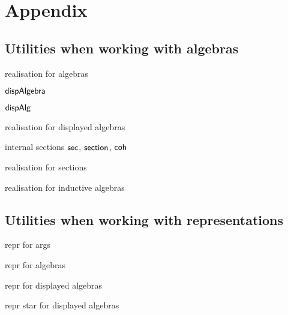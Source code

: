 \section{Appendix}

\subsection{Utilities when working with algebras} \label{app:algebras}

realisation for algebras

$\textsf{dispAlgebra}$

$\textsf{dispAlg}$

realisation for displayed algebras

internal sections $\textsf{sec}$, $\textsf{section}$, $\textsf{coh}$

realisation for sections

realisation for inductive algebras

\subsection{Utilities when working with representations} \label{app:reprs}

repr for args

repr for algebras

repr for displayed algebras

repr star for displayed algebras




